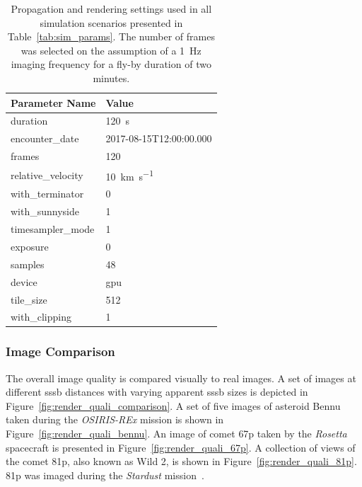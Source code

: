 \begin{table}[htb]
    \centering
    \caption{Propagation and rendering settings used in all simulation scenarios presented in Table~\ref{tab:sim_params}. The number of frames was selected on the assumption of a \SI{1}{\hertz} imaging frequency for a fly-by duration of two minutes.}
    \label{tab:sim_settings}
    \begin{tabular}{l|l}
        \textbf{Parameter Name} & \textbf{Value} \\ \hline
        duration       & \SI{120}{\second}   \\
        encounter\_date & 2017-08-15T12:00:00.000\\
        frames       & \SI{120}{}     \\
        relative\_velocity     &  \SI{10}{\kilo\meter\per\second} \\
        with\_terminator  & \SI{0}{} \\
        with\_sunnyside & \SI{1}{} \\
        timesampler\_mode & \SI{1}{} \\
        exposure & \SI{0}{} \\
        samples & \SI{48}{} \\
        device & \gls{gpu} \\
        tile\_size & \SI{512}{} \\
        with\_clipping & \SI{1}{}
    \end{tabular}
\end{table}

\subsubsection{Image Comparison}
The overall image quality is compared visually to real images. A set of images at different \gls{sssb} distances with varying apparent \gls{sssb} sizes is depicted in Figure~\ref{fig:render_quali_comparison}. A set of five images of asteroid Bennu taken during the \textit{OSIRIS-REx} mission is shown in Figure~\ref{fig:render_quali_bennu}. An image of comet \gls{67p} taken by the \textit{Rosetta} spacecraft is presented in Figure~\ref{fig:render_quali_67p}. A collection of views of the comet \gls{81p}, also known as Wild 2, is shown in Figure~\ref{fig:render_quali_81p}. \Gls{81p} was imaged during the \textit{Stardust} mission~\cite{Brownlee2003Stardust:Mission}.


